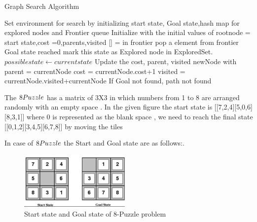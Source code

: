 \documentclass[15pt,journal]{IEEEtran}
\begin{document}
\begin{algorithm}
\caption{Graph Search Algorithm}\label{alg:cap}
\begin{algorithmic}[1]
\State Set environment for search by initializing start state, Goal state,hash map for explored nodes and Frontier queue
\State Initialize with the initial values of rootnode = start state,cost =0,parents,visited [] = in frontier
    \State pop a element from frontier
        \State Goal state reached
    \Else
        \State mark this state as Explored node in ExploredSet.
    \State $possible state \gets current state$
                     \State Update the cost, parent, visited
                \EndIf
            \Else
                \State newNode with parent = currentNode
                \State cost = currentNode.cost+1
                \State visited = currentNode.visited+currentNode
            \EndIf
            \State If Goal not found, path not found
        \EndIf
    \EndFor
    \EndIf           
\EndWhile
\end{algorithmic}
\end{algorithm}




The {$8\-Puzzle$} has a matrix of 3X3 in which numbers from 1 to 8 are arranged randomly with an empty space . In the given figure the start state is [[7,2,4][5,0,6][8,3,1]] where 0 is represented as the blank space , we need to reach the final state [[0,1,2][3,4,5][6,7,8]] by moving the tiles

In case of {$8\-Puzzle$} the Start and  Goal state are as follows:.


\begin{figure}[H]%
\begin {center}
\includegraphics[width=0.48\textwidth]{images/8 puzzle.png}
\caption{Start state and Goal state of 8-Puzzle problem} %
\label{fig:ecg}
\end {center}
\end{figure}
\end{document}
